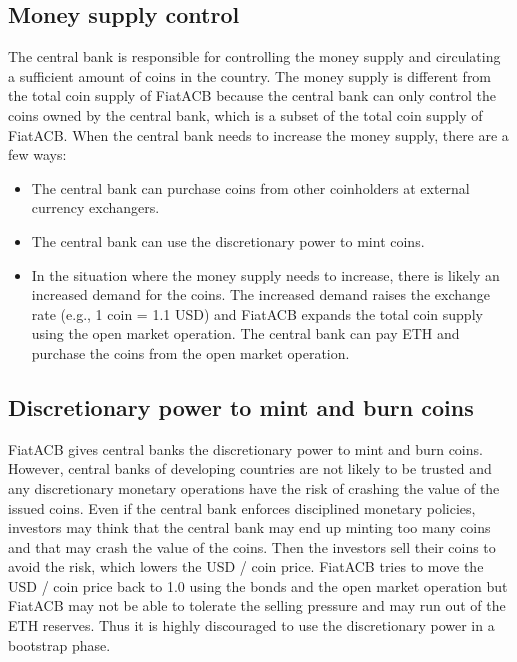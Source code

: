 \documentclass[dvipdfmx,a4paper]{article}
\begin{document}
\subsection{Money supply control}

The central bank is responsible for controlling the money supply and circulating a sufficient amount of coins in the country. The money supply is different from the total coin supply of FiatACB because the central bank can only control the coins owned by the central bank, which is a subset of the total coin supply of FiatACB. When the central bank needs to increase the money supply, there are a few ways:

\begin{itemize}
\item The central bank can purchase coins from other coinholders at external currency exchangers.
\item The central bank can use the discretionary power to mint coins.
\item In the situation where the money supply needs to increase, there is likely an increased demand for the coins. The increased demand raises the exchange rate (e.g., 1 coin = 1.1 USD) and FiatACB expands the total coin supply using the open market operation. The central bank can pay ETH and purchase the coins from the open market operation.
\end{itemize}

\subsection{Discretionary power to mint and burn coins}
\label{discretionary_power}

FiatACB gives central banks the discretionary power to mint and burn coins. However, central banks of developing countries are not likely to be trusted and any discretionary monetary operations have the risk of crashing the value of the issued coins. Even if the central bank enforces disciplined monetary policies, investors may think that the central bank may end up minting too many coins and that may crash the value of the coins. Then the investors sell their coins to avoid the risk, which lowers the USD / coin price. FiatACB tries to move the USD / coin price back to 1.0 using the bonds and the open market operation but FiatACB may not be able to tolerate the selling pressure and may run out of the ETH reserves. Thus it is highly discouraged to use the discretionary power in a bootstrap phase.
\end{document}
